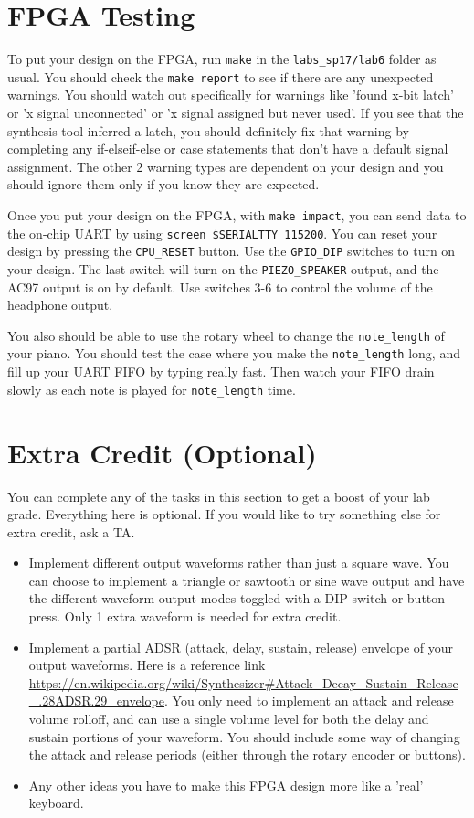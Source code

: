 \documentclass[11pt]{article}
\begin{document}
\section{FPGA Testing}
To put your design on the FPGA, run \verb|make| in the \verb|labs_sp17/lab6| folder as usual. You should check the \verb|make report| to see if there are any unexpected warnings. You should watch out specifically for warnings like 'found x-bit latch' or 'x signal unconnected' or 'x signal assigned but never used'. If you see that the synthesis tool inferred a latch, you should definitely fix that warning by completing any if-elseif-else or case statements that don't have a default signal assignment. The other 2 warning types are dependent on your design and you should ignore them only if you know they are expected.

Once you put your design on the FPGA, with \verb|make impact|, you can send data to the on-chip UART by using \verb|screen $SERIALTTY 115200|. You can reset your design by pressing the \verb|CPU_RESET| button. Use the \verb|GPIO_DIP| switches to turn on your design. The last switch will turn on the \verb|PIEZO_SPEAKER| output, and the AC97 output is on by default. Use switches 3-6 to control the volume of the headphone output.

You also should be able to use the rotary wheel to change the \verb|note_length| of your piano. You should test the case where you make the \verb|note_length| long, and fill up your UART FIFO by typing really fast. Then watch your FIFO drain slowly as each note is played for \verb|note_length| time.

\section{Extra Credit (Optional)}
You can complete any of the tasks in this section to get a boost of your lab grade. Everything here is optional. If you would like to try something else for extra credit, ask a TA.

\begin{itemize}
	\item Implement different output waveforms rather than just a square wave. You can choose to implement a triangle or sawtooth or sine wave output and have the different waveform output modes toggled with a DIP switch or button press. Only 1 extra waveform is needed for extra credit.
	\item Implement a partial ADSR (attack, delay, sustain, release) envelope of your output waveforms. Here is a reference link \url{https://en.wikipedia.org/wiki/Synthesizer#Attack_Decay_Sustain_Release_.28ADSR.29_envelope}. You only need to implement an attack and release volume rolloff, and can use a single volume level for both the delay and sustain portions of your waveform. You should include some way of changing the attack and release periods (either through the rotary encoder or buttons).
	\item Any other ideas you have to make this FPGA design more like a 'real' keyboard.
\end{itemize}
\end{document}
